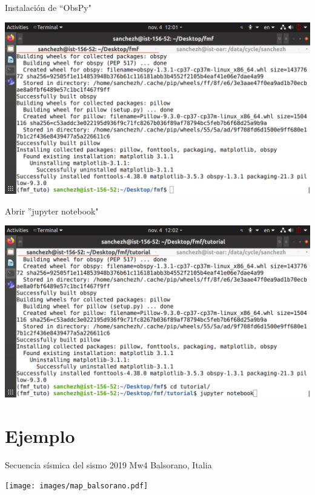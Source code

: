 \documentclass{beamer}
\begin{document}
\begin{frame}
 {Instalaci\'on de ``ObsPy"}
 
 \centering
 \includegraphics[width=1\linewidth]{images/succes_install_obspy.png}
 
\end{frame}


\begin{frame}
 {Abrir ''jupyter notebook"}

 \centering
 \includegraphics[width=1\linewidth]{images/jupyter_notebook.png}
 
\end{frame}



\section{Ejemplo}

\begin{frame}
 {Secuencia s\'ismica del sismo 2019 Mw4 Balsorano, Italia}

 \begin{minipage}{1\linewidth}
  \centering \texttt{[image: images/map\_balsorano.pdf]}
 \end{minipage} 
 
\end{frame}
\end{document}
